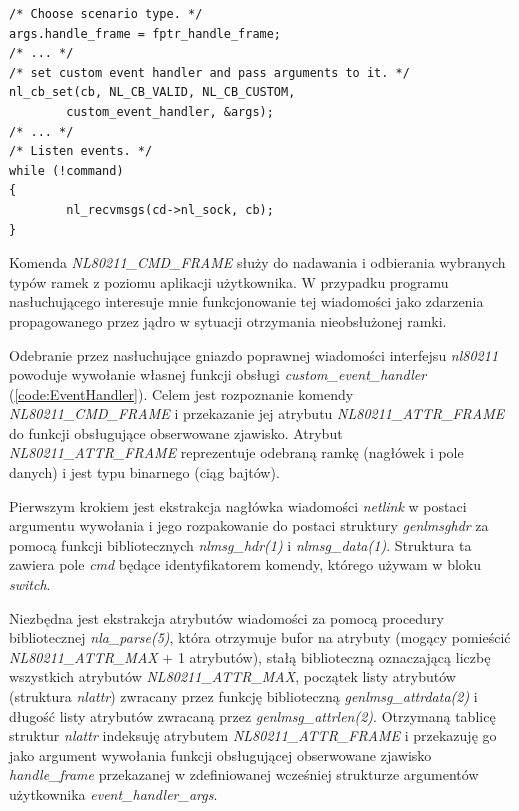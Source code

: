 \begin{lstlisting}[frame=tb]
/* Choose scenario type. */
args.handle_frame = fptr_handle_frame;
/* ... */
/* set custom event handler and pass arguments to it. */
nl_cb_set(cb, NL_CB_VALID, NL_CB_CUSTOM,
        custom_event_handler, &args);
/* ... */
/* Listen events. */
while (!command)
{
        nl_recvmsgs(cd->nl_sock, cb);
}
\end{lstlisting}

Komenda \emph{NL80211\_CMD\_FRAME} służy do nadawania i odbierania wybranych typów ramek z poziomu aplikacji użytkownika. W przypadku programu nasłuchującego interesuje mnie funkcjonowanie tej wiadomości jako zdarzenia propagowanego przez jądro w sytuacji otrzymania nieobsłużonej ramki. 

Odebranie przez nasłuchujące gniazdo poprawnej wiadomości interfejsu \emph{nl80211} powoduje wywołanie własnej funkcji obsługi \emph{custom\_event\_handler} (\ref{code:EventHandler}). Celem jest rozpoznanie komendy \emph{NL80211\_CMD\_FRAME} i przekazanie jej atrybutu \emph{NL80211\_ATTR\_FRAME} do funkcji obsługujące obserwowane zjawisko. Atrybut \emph{NL80211\_ATTR\_FRAME} reprezentuje odebraną ramkę (nagłówek i pole danych) i jest typu binarnego (ciąg bajtów). 

Pierwszym krokiem jest ekstrakcja nagłówka wiadomości \emph{netlink} w postaci argumentu wywołania i jego rozpakowanie  do postaci struktury \emph{genlmsghdr} za pomocą funkcji bibliotecznych \emph{nlmsg\_hdr(1)} i \emph{nlmsg\_data(1)}. Struktura ta zawiera pole \emph{cmd} będące identyfikatorem komendy, którego używam w bloku \emph{switch}.

Niezbędna jest ekstrakcja atrybutów wiadomości za pomocą procedury bibliotecznej \emph{nla\_parse(5)}, która otrzymuje bufor na atrybuty (mogący pomieścić \emph{NL80211\_ATTR\_MAX} + 1 atrybutów), stałą biblioteczną oznaczającą liczbę wszystkich atrybutów \emph{NL80211\_ATTR\_MAX}, początek listy atrybutów (struktura \emph{nlattr}) zwracany przez funkcję biblioteczną \emph{genlmsg\_attrdata(2)} i długość listy atrybutów zwracaną przez \emph{genlmsg\_attrlen(2)}. Otrzymaną tablicę struktur \emph{nlattr} indeksuję atrybutem \emph{NL80211\_ATTR\_FRAME} i przekazuję go jako argument wywołania funkcji obsługującej obserwowane zjawisko \emph{handle\_frame} przekazanej w zdefiniowanej wcześniej strukturze argumentów użytkownika \emph{event\_handler\_args}. 

